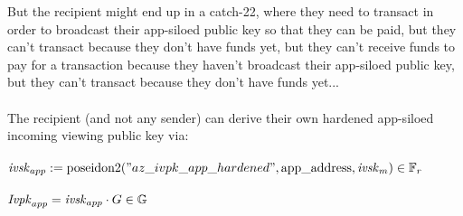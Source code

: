 But the recipient might end up in a catch-22, where they need to transact in order to broadcast their app-siloed public key so that they can be paid, but they can't transact because they don't have funds yet, but they can't receive funds to pay for a transaction because they haven't broadcast their app-siloed public key, but they can't transact because they don't have funds yet...\\
\\
The recipient (and not any sender) can derive their own hardened app-siloed incoming viewing public key via:\\
\\
$\ivskapp := \poseidon("az\_ivpk\_app\_hardened", \appaddress, \ivskm)  \in \Fr$\\
\\
$\Ivpkapp = \ivskapp \cdot G \in \G$\\
\\
\\
\\

